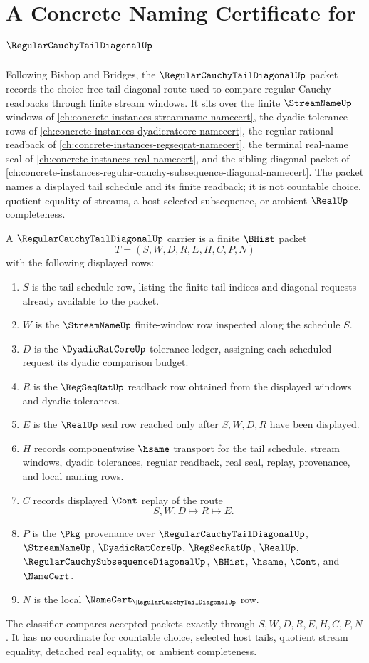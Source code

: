 \chapter{A Concrete Naming Certificate for $\RegularCauchyTailDiagonalUp$}
\label{ch:concrete-instances-regular-cauchy-tail-diagonal-namecert}

Following Bishop and Bridges, the $\RegularCauchyTailDiagonalUp$ packet records the choice-free tail diagonal route used to compare regular Cauchy readbacks through finite stream windows. It sits over the finite $\StreamNameUp$ windows of \autoref{ch:concrete-instances-streamname-namecert}, the dyadic tolerance rows of \autoref{ch:concrete-instances-dyadicratcore-namecert}, the regular rational readback of \autoref{ch:concrete-instances-regseqrat-namecert}, the terminal real-name seal of \autoref{ch:concrete-instances-real-namecert}, and the sibling diagonal packet of \autoref{ch:concrete-instances-regular-cauchy-subsequence-diagonal-namecert}. The packet names a displayed tail schedule and its finite readback; it is not countable choice, quotient equality of streams, a host-selected subsequence, or ambient $\RealUp$ completeness.

\begin{definition}
\label{def:regular-cauchy-tail-diagonal-carrier}
A $\RegularCauchyTailDiagonalUp$ carrier is a finite $\BHist$ packet
$$
T=(S,W,D,R,E,H,C,P,N)
$$
with the following displayed rows:
\begin{enumerate}
\item $S$ is the tail schedule row, listing the finite tail indices and diagonal requests already available to the packet.
\item $W$ is the $\StreamNameUp$ finite-window row inspected along the schedule $S$.
\item $D$ is the $\DyadicRatCoreUp$ tolerance ledger, assigning each scheduled request its dyadic comparison budget.
\item $R$ is the $\RegSeqRatUp$ readback row obtained from the displayed windows and dyadic tolerances.
\item $E$ is the $\RealUp$ seal row reached only after $S,W,D,R$ have been displayed.
\item $H$ records componentwise $\hsame$ transport for the tail schedule, stream windows, dyadic tolerances, regular readback, real seal, replay, provenance, and local naming rows.
\item $C$ records displayed $\Cont$ replay of the route
$$
S,W,D \longmapsto R \longmapsto E .
$$
\item $P$ is the $\Pkg$ provenance over $\RegularCauchyTailDiagonalUp$, $\StreamNameUp$, $\DyadicRatCoreUp$, $\RegSeqRatUp$, $\RealUp$, $\RegularCauchySubsequenceDiagonalUp$, $\BHist$, $\hsame$, $\Cont$, and $\NameCert$.
\item $N$ is the local $\NameCert_{\RegularCauchyTailDiagonalUp}$ row.
\end{enumerate}
The classifier compares accepted packets exactly through $S,W,D,R,E,H,C,P,N$. It has no coordinate for countable choice, selected host tails, quotient stream equality, detached real equality, or ambient completeness.
\end{definition}

